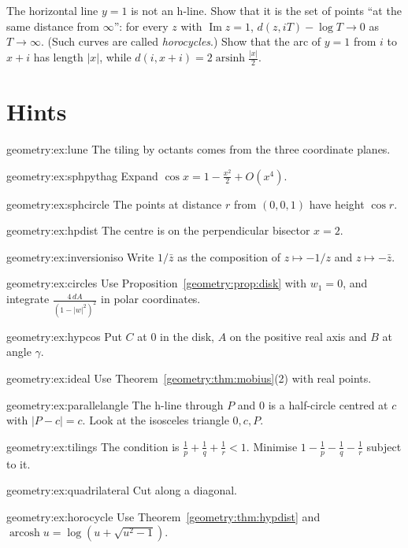 \begin{exercise}[$\star\star\star$]\label{geometry:ex:horocycle}
The horizontal line $y=1$ is not an h-line. Show that it is the set of points ``at the same distance from $\infty$'': for every $z$ with $\operatorname{Im}z=1$,
$d(z,iT)-\log T\to0$ as $T\to\infty$. (Such curves are called \emph{horocycles}.) Show that the arc of $y=1$ from $i$ to $x+i$ has length $|x|$, while
$d(i,x+i)=2\operatorname{arsinh}\frac{|x|}2$.
\end{exercise}

\section{Hints}

\begin{hint}{geometry:ex:lune}
The tiling by octants comes from the three coordinate planes.
\end{hint}
\begin{hint}{geometry:ex:sphpythag}
Expand $\cos x=1-\frac{x^2}2+O(x^4)$.
\end{hint}
\begin{hint}{geometry:ex:sphcircle}
The points at distance $r$ from $(0,0,1)$ have height $\cos r$.
\end{hint}
\begin{hint}{geometry:ex:hpdist}
The centre is on the perpendicular bisector $x=2$.
\end{hint}
\begin{hint}{geometry:ex:inversioniso}
Write $1/\bar z$ as the composition of $z\mapsto-1/z$ and $z\mapsto-\bar z$.
\end{hint}
\begin{hint}{geometry:ex:circles}
Use Proposition~\ref{geometry:prop:disk} with $w_1=0$, and integrate $\frac{4\,dA}{(1-|w|^2)^2}$ in polar coordinates.
\end{hint}
\begin{hint}{geometry:ex:hypcos}
Put $C$ at $0$ in the disk, $A$ on the positive real axis and $B$ at angle $\gamma$.
\end{hint}
\begin{hint}{geometry:ex:ideal}
Use Theorem~\ref{geometry:thm:mobius}(2) with real points.
\end{hint}
\begin{hint}{geometry:ex:parallelangle}
The h-line through $P$ and $0$ is a half-circle centred at $c$ with $|P-c|=c$. Look at the isosceles triangle $0,c,P$.
\end{hint}
\begin{hint}{geometry:ex:tilings}
The condition is $\frac1p+\frac1q+\frac1r<1$. Minimise $1-\frac1p-\frac1q-\frac1r$ subject to it.
\end{hint}
\begin{hint}{geometry:ex:quadrilateral}
Cut along a diagonal.
\end{hint}
\begin{hint}{geometry:ex:horocycle}
Use Theorem~\ref{geometry:thm:hypdist} and $\operatorname{arcosh}u=\log(u+\sqrt{u^2-1})$.
\end{hint}

